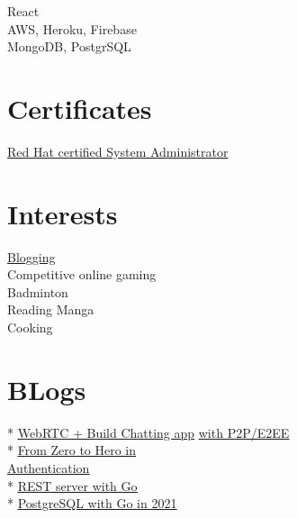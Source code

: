 \documentclass[]{Kushagra-build}
\begin{document}
\begin{minipage}[t]{0.29\textwidth}
React \\

AWS, Heroku, Firebase \\
MongoDB, PostgrSQL \\

\sectionsep

\section{Certificates}
\href{https://rhtapps.redhat.com/certifications/badge/verify/JBADVLBCAISWJFM6KOGIYCQ6PYAEQU3CUPSQX2KSDXT6RW46LQ3T7ULZ55KZZ56SKO7EQ3ETTLYZQ4U5NQYTCNA62RUWOCM34WWBUYQ=}{Red Hat certified System Administrator} \\
\sectionsep


\section{Interests}
    \href{https://dev.to/kushagra_mehta}{Blogging} \\
    Competitive online gaming \\
    Badminton \\
    Reading Manga \\
    Cooking \\
\sectionsep

\section{BLogs}

* \href{https://dev.to/kushagra_mehta/webrtc-build-yet-another-chatting-app-but-p2p-e2ee-1l7j}{\underline{WebRTC + Build Chatting app}}
\href{https://dev.to/kushagra_mehta/webrtc-build-yet-another-chatting-app-but-p2p-e2ee-1l7j}{\underline{with P2P/E2EE\faLink}} \\
\vspace{0.8em}
* \href{https://dev.to/kushagra_mehta/series/12260}{\underline{From Zero to Hero in}} \\
\href{https://dev.to/kushagra_mehta/series/12260}{\underline{Authentication\faLink}} \\
\vspace{0.8em}
* \href{https://dev.to/kushagra_mehta/rest-server-with-go-in-5-minutes-3n8l}{\underline{REST server with Go\faLink}}\\
\vspace{0.8em}
* \href{https://dev.to/kushagra_mehta/postgresql-with-go-in-2021-3dfg}{\underline{PostgreSQL with Go in 2021\faLink}} \\
\vspace{0.8em}



\sectionsep
{}

%
%
\end{minipage} 
\end{document}
